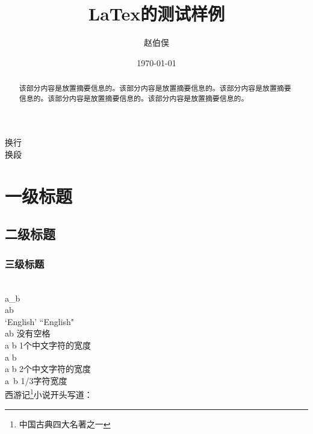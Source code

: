 \documentclass[onecolumn]{article} %
\title{LaTex的测试样例}  %
\author{赵伯俣}   %
\date{\today}       %
\begin{document}
\pagecolor{gray}

\maketitle     

换行\\[2pt]
换段\par

\renewcommand{\contentsname}{目录} %
\tableofcontents     

\newpage
\begin{abstract}
该部分内容是放置摘要信息的。该部分内容是放置摘要信息的。该部分内容是放置摘要信息的。该部分内容是放置摘要信息的。该部分内容是放置摘要信息的。
\end{abstract}

\newpage
\section{一级标题}
\subsection{二级标题}
\subsubsection{三级标题}

\newpage

\hspace*{2em}{段落的首行缩进段落的首行缩进段落的首行缩进段落的首行缩进段落的首行缩进段落的首行缩进段落的首行缩进段落的首行缩进段落的首行缩进}\\

a\_b\\
a\textunderscore b\\

\iffalse
注释内容
\fi

`English'
``English"\\

ab 没有空格\\[4pt] 
a \quad b 1个中文字符的宽度\\
a b\\
a \qquad b  2个中文字符的宽度\\
a\ b 1/3字符宽度\\

西游记\footnote{中国古典四大名著之一}小说开头写道：
\end{document}
